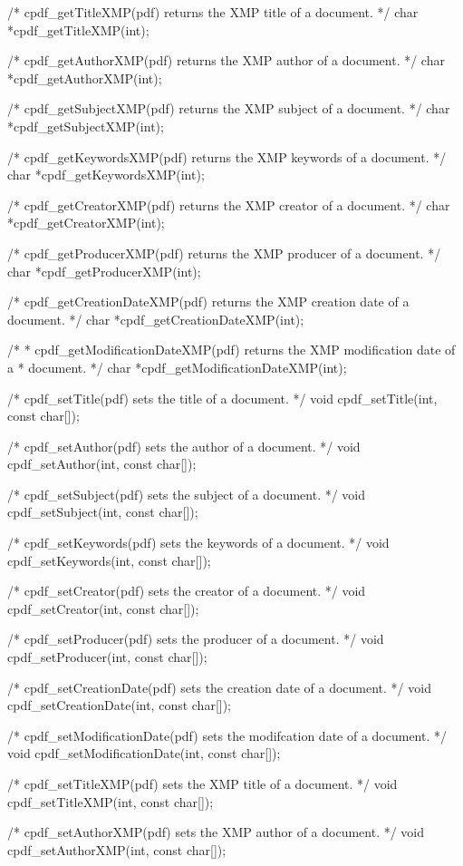 /* cpdf_getTitleXMP(pdf) returns the XMP title of a document. */
char *cpdf_getTitleXMP(int);

/* cpdf_getAuthorXMP(pdf) returns the XMP author of a document. */
char *cpdf_getAuthorXMP(int);

/* cpdf_getSubjectXMP(pdf) returns the XMP subject of a document. */
char *cpdf_getSubjectXMP(int);

/* cpdf_getKeywordsXMP(pdf) returns the XMP keywords of a document. */
char *cpdf_getKeywordsXMP(int);

/* cpdf_getCreatorXMP(pdf) returns the XMP creator of a document. */
char *cpdf_getCreatorXMP(int);

/* cpdf_getProducerXMP(pdf) returns the XMP producer of a document. */
char *cpdf_getProducerXMP(int);

/* cpdf_getCreationDateXMP(pdf) returns the XMP creation date of a document. */
char *cpdf_getCreationDateXMP(int);

/*
 * cpdf_getModificationDateXMP(pdf) returns the XMP modification date of a
 * document.
 */
char *cpdf_getModificationDateXMP(int);

/* cpdf_setTitle(pdf) sets the title of a document. */
void cpdf_setTitle(int, const char[]);

/* cpdf_setAuthor(pdf) sets the author of a document. */
void cpdf_setAuthor(int, const char[]);

/* cpdf_setSubject(pdf) sets the subject of a document. */
void cpdf_setSubject(int, const char[]);

/* cpdf_setKeywords(pdf) sets the keywords of a document. */
void cpdf_setKeywords(int, const char[]);

/* cpdf_setCreator(pdf) sets the creator of a document. */
void cpdf_setCreator(int, const char[]);

/* cpdf_setProducer(pdf) sets the producer of a document. */
void cpdf_setProducer(int, const char[]);

/* cpdf_setCreationDate(pdf) sets the creation date of a document. */
void cpdf_setCreationDate(int, const char[]);

/* cpdf_setModificationDate(pdf) sets the modifcation date of a document. */
void cpdf_setModificationDate(int, const char[]);

/* cpdf_setTitleXMP(pdf) sets the XMP title of a document. */
void cpdf_setTitleXMP(int, const char[]);

/* cpdf_setAuthorXMP(pdf) sets the XMP author of a document. */
void cpdf_setAuthorXMP(int, const char[]);

